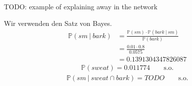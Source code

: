 \documentclass[a4paper]{scrartcl}
\newcommand{\prob}{\mathbb{P}}
\begin{document}
TODO: example of explaining away in the network

Wir verwenden den Satz von Bayes.
\begin{equation*}
    \begin{split}
        \prob(sm\ |\ bark)
        &= \frac{\prob(sm) \cdot \prob(bark\ |\ sm)}{\prob(bark)} \\
        &= \frac{\num{0,01} \cdot \num{0,8}}{\num{0,0575}} \\
        &= \num{0.1391304347826087}
    \end{split}
\end{equation*}
\begin{equation*}
    \begin{split}
        \prob(sweat) = \num{0.011774}
        \qquad \text{s.o.}
    \end{split}
\end{equation*}
\begin{equation*}
    \begin{split}
        \prob(sm\ |\ sweat \cap bark) = TODO
        \qquad \text{s.o.}
    \end{split}
\end{equation*}
\end{document}
